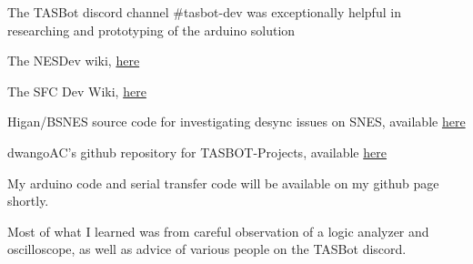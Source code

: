 \documentclass{article}
\begin{document}
\begin{thebibliography}{1}

\newblock The TASBot discord channel \#tasbot-dev was exceptionally helpful in researching and prototyping of the arduino solution

\newblock The NESDev wiki, \href{http://wiki.nesdev.com/w/index.php/Nesdev_Wiki}{here}

\newblock The SFC Dev Wiki, \href{https://wiki.superfamicom.org/}{here}

\newblock Higan/BSNES source code for investigating desync issues on SNES, available \href{https://byuu.org/}{here}

\newblock dwangoAC's github repository for TASBOT-Projects, available \href{https://github.com/dwangoac/TASBot-Projects}{here}

\newblock My arduino code and serial transfer code will be available on my github page shortly. 

\newblock Most of what I learned was from careful observation of a logic analyzer and oscilloscope, as well as advice of various people on the TASBot discord.  

%
%

\end{thebibliography}
\end{document}
